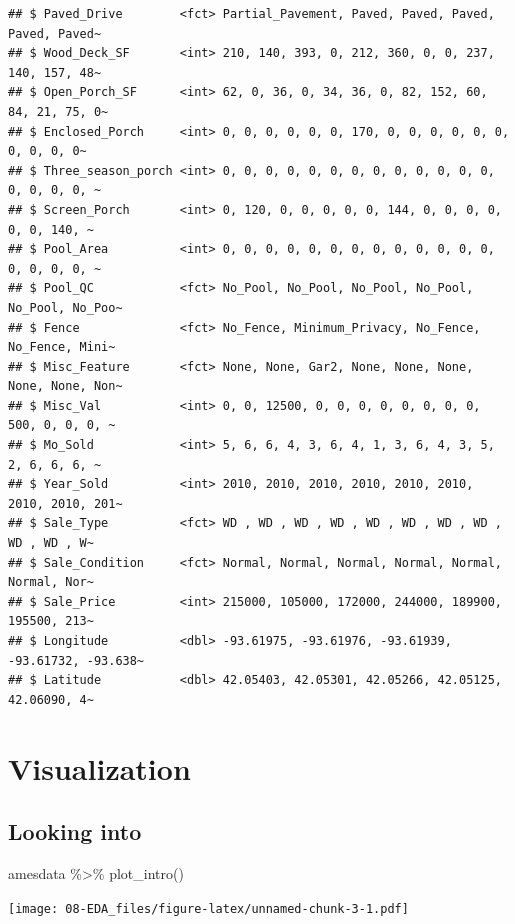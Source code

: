 \documentclass[
]{book}
\newenvironment{Shaded}{\begin{snugshade}}{\end{snugshade}}
\newcommand{\FunctionTok}[1]{\textcolor[rgb]{0.00,0.00,0.00}{#1}}
\newcommand{\NormalTok}[1]{#1}
\newcommand{\SpecialCharTok}[1]{\textcolor[rgb]{0.00,0.00,0.00}{#1}}
\begin{document}
\begin{verbatim}
## $ Paved_Drive        <fct> Partial_Pavement, Paved, Paved, Paved, Paved, Paved~
## $ Wood_Deck_SF       <int> 210, 140, 393, 0, 212, 360, 0, 0, 237, 140, 157, 48~
## $ Open_Porch_SF      <int> 62, 0, 36, 0, 34, 36, 0, 82, 152, 60, 84, 21, 75, 0~
## $ Enclosed_Porch     <int> 0, 0, 0, 0, 0, 0, 170, 0, 0, 0, 0, 0, 0, 0, 0, 0, 0~
## $ Three_season_porch <int> 0, 0, 0, 0, 0, 0, 0, 0, 0, 0, 0, 0, 0, 0, 0, 0, 0, ~
## $ Screen_Porch       <int> 0, 120, 0, 0, 0, 0, 0, 144, 0, 0, 0, 0, 0, 0, 140, ~
## $ Pool_Area          <int> 0, 0, 0, 0, 0, 0, 0, 0, 0, 0, 0, 0, 0, 0, 0, 0, 0, ~
## $ Pool_QC            <fct> No_Pool, No_Pool, No_Pool, No_Pool, No_Pool, No_Poo~
## $ Fence              <fct> No_Fence, Minimum_Privacy, No_Fence, No_Fence, Mini~
## $ Misc_Feature       <fct> None, None, Gar2, None, None, None, None, None, Non~
## $ Misc_Val           <int> 0, 0, 12500, 0, 0, 0, 0, 0, 0, 0, 0, 500, 0, 0, 0, ~
## $ Mo_Sold            <int> 5, 6, 6, 4, 3, 6, 4, 1, 3, 6, 4, 3, 5, 2, 6, 6, 6, ~
## $ Year_Sold          <int> 2010, 2010, 2010, 2010, 2010, 2010, 2010, 2010, 201~
## $ Sale_Type          <fct> WD , WD , WD , WD , WD , WD , WD , WD , WD , WD , W~
## $ Sale_Condition     <fct> Normal, Normal, Normal, Normal, Normal, Normal, Nor~
## $ Sale_Price         <int> 215000, 105000, 172000, 244000, 189900, 195500, 213~
## $ Longitude          <dbl> -93.61975, -93.61976, -93.61939, -93.61732, -93.638~
## $ Latitude           <dbl> 42.05403, 42.05301, 42.05266, 42.05125, 42.06090, 4~
\end{verbatim}

\hypertarget{visualization}{%
\section{Visualization}\label{visualization}}

\hypertarget{looking-into}{%
\subsection{Looking into}\label{looking-into}}

\begin{Shaded}
\begin{Highlighting}[]
\NormalTok{amesdata }\SpecialCharTok{\%\textgreater{}\%} \FunctionTok{plot\_intro}\NormalTok{()}
\end{Highlighting}
\end{Shaded}

\texttt{[image: 08-EDA\_files/figure-latex/unnamed-chunk-3-1.pdf]}
\end{document}
